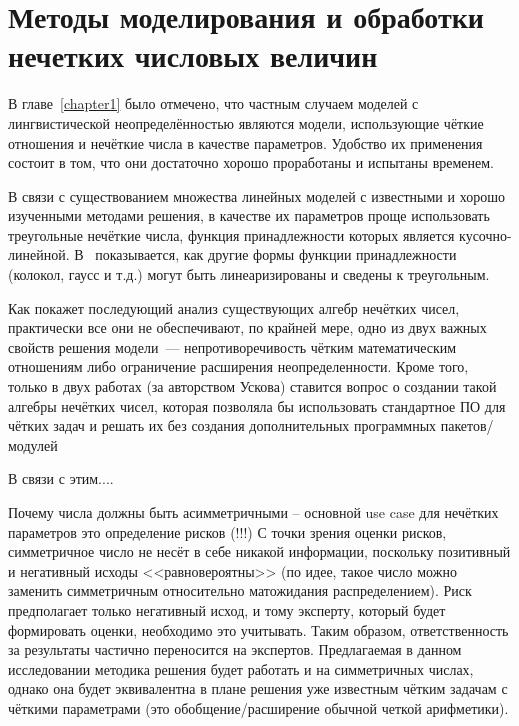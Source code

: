 \chapter{Методы моделирования и обработки нечетких числовых величин}
\label{chapter2}

В главе~\ref{chapter1} было отмечено, что частным случаем моделей с лингвистической неопределённостью являются модели, использующие чёткие отношения и нечёткие числа в качестве параметров. Удобство их применения состоит в том, что они достаточно хорошо проработаны и испытаны временем.

В связи с существованием множества линейных моделей с известными и хорошо изученными методами решения, в качестве их параметров проще использовать треугольные нечёткие числа, функция принадлежности которых является кусочно-линейной. В~\cite{Hanss_Engineering} показывается, как другие формы функции принадлежности (колокол, гаусс и т.д.) могут быть линеаризированы и сведены к треугольным.


Как покажет последующий анализ существующих алгебр нечётких чисел, практически все они не обеспечивают, по крайней мере, одно из двух важных свойств решения модели~--- непротиворечивость чётким математическим отношениям либо ограничение расширения неопределенности. Кроме того, только в двух работах (за авторством Ускова) ставится вопрос о создании такой алгебры нечётких чисел, которая позволяла бы использовать стандартное ПО для чётких задач и решать их без создания дополнительных программных пакетов/модулей

В связи с этим.... 

Почему числа должны быть асимметричными – основной use case для нечётких параметров это определение рисков (!!!) С точки зрения оценки рисков, симметричное число не несёт в себе никакой информации, поскольку позитивный и негативный исходы <<равновероятны>> (по идее, такое число можно заменить симметричным относительно матожидания распределением). Риск предполагает только негативный исход, и тому эксперту, который будет формировать оценки, необходимо это учитывать. Таким образом, ответственность за результаты частично переносится на экспертов. Предлагаемая в данном исследовании методика решения будет работать и на симметричных числах, однако она будет эквивалентна в плане решения уже известным чётким задачам с чёткими параметрами (это обобщение/расширение обычной четкой арифметики).

